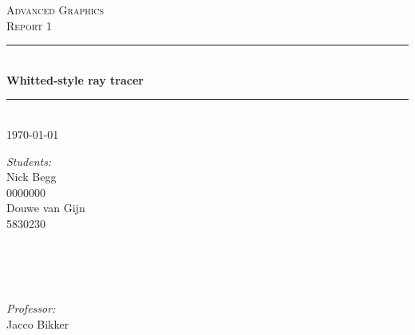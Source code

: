 \documentclass[a4paper,12pt]{article}
\newcommand{\vak}{Advanced Graphics}
\newcommand{\type}{Report 1}
\newcommand{\titel}{Whitted-style ray tracer}
\newcommand{\studentA}{Nick Begg}
\newcommand{\uvanetidA}{0000000}
\newcommand{\studentB}{Douwe van Gijn}
\newcommand{\uvanetidB}{5830230}
\newcommand{\docent}{Jacco Bikker}
\newcommand{\datum}{\today}
\begin{document}
\thispagestyle{firststyle}
\begin{center}
	\textsc{\LARGE \vak}\\[1cm]
	\textsc{\huge \type}\\[0.5cm]
		\rule{\linewidth}{0.5pt} \\[0.5cm]
			{\huge \bfseries \titel}
		\rule{\linewidth}{0.5pt} \\[0.5cm]
	{\large \datum\\[1.5cm]}
	
	\begin{minipage}{0.4\textwidth}
		\begin{flushleft} 
			\emph{Students:}\\[0.1cm]
			{\studentA\\ {\uvanetidA\\[0.2cm]}}
			{\studentB\\ {\uvanetidB\\[0.2cm]}}
			{\studentC\\ {\uvanetidC\\[0.2cm]}}
		\end{flushleft}
	\end{minipage}~%
	\begin{minipage}{0.4\textwidth}
		\begin{flushright} 
			\emph{Professor:} \\[0.1cm]
			\docent\\[0.2cm]
		\end{flushright}
	\end{minipage}\\[1.5 cm]
\end{center}

\newpage

\end{document}
